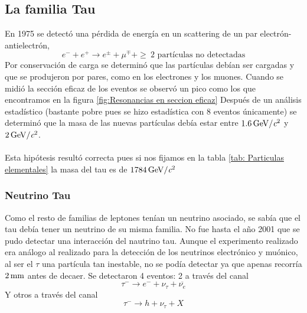 \subsection{La familia Tau}
En 1975 se detectó una pérdida de energía en un scattering de un par electrón-antielectrón,
\begin{equation}
    e^-+e^+\longrightarrow e^\pm +\mu^\mp + \geq \ \text{2 partículas no detectadas}
\end{equation}
Por conservación de carga se determinó que las partículas debían ser cargadas y que se produjeron por pares, como en los electrones y los muones. Cuando se midió la sección eficaz de los eventos se observó un pico como los que encontramos en la figura \ref{fig:Resonancias en seccion eficaz}  %
Después de un análisis estadístico (bastante pobre pues se hizo estadística con 8 eventos únicamente) se determinó que la masa de las nuevas partículas debía estar entre $\unit[1.6]{GeV/\textit{c}^2}$ y $\unit[2]{GeV/\textit{c}^2}$.
\\\\
Esta hipótesis resultó correcta pues si nos fijamos en la tabla \ref{tab: Particulas elementales} la masa del tau es de $\unit[1784]{GeV/\textit{c}^2}$
\subsubsection{Neutrino Tau}
Como el resto de familias de leptones tenían un neutrino asociado, se sabía que el tau debía tener un neutrino de su misma familia. No fue hasta el año 2001 que se pudo detectar una interacción del nautrino tau. Aunque el experimento realizado era análogo al realizado para la detección de los neutrinos electrónico y muónico, al ser el $\tau$ una partícula tan inestable, no se podía detectar ya que apenas recorría $\unit[2]{mm}$ antes de decaer. Se detectaron 4 eventos: 2 a través del canal
\begin{equation}
    \tau^- \longrightarrow e^-+\nu_\tau+\overline{\nu_e}
\end{equation}
Y otros a través del canal 
\begin{equation}
    \tau^- \longrightarrow h+\nu_\tau+X
\end{equation}
